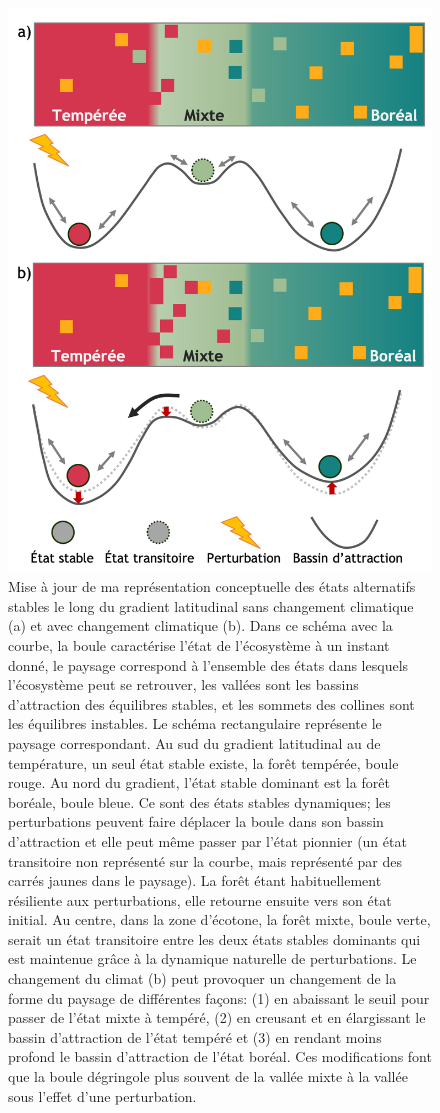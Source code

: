 \begin{figure}
\centering
\includegraphics[width=.65\textwidth]{conclusion/figures/etat_alternatif2.png}
\caption[Représentation conceptuelle des états alternatifs stables le long du gradient latitudinal]{Mise à jour de ma représentation conceptuelle des états alternatifs stables le long du gradient latitudinal sans changement climatique (a) et avec changement climatique (b). Dans ce schéma avec la courbe, la boule caractérise l'état de l'écosystème à un instant donné, le paysage correspond à l'ensemble des états dans lesquels l’écosystème peut se retrouver, les vallées sont les bassins d'attraction des équilibres stables, et les sommets des collines sont les équilibres instables. Le schéma rectangulaire représente le paysage correspondant. Au sud du gradient latitudinal au de température, un seul état stable existe, la forêt tempérée, boule rouge. Au nord du gradient, l'état stable dominant est la forêt boréale, boule bleue. Ce sont des états stables dynamiques; les perturbations peuvent faire déplacer la boule dans son bassin d'attraction et elle peut même passer par l'état pionnier (un état transitoire non représenté sur la courbe, mais représenté par des carrés jaunes dans le paysage). La forêt étant habituellement résiliente aux perturbations, elle retourne ensuite vers son état initial. Au centre, dans la zone d'écotone, la forêt mixte, boule verte, serait un état transitoire entre les deux états stables dominants qui est maintenue grâce à la dynamique naturelle de perturbations. Le changement du climat (b) peut provoquer un changement de la forme du paysage de différentes façons: (1) en abaissant le seuil pour passer de l'état mixte à tempéré, (2) en creusant et en élargissant le bassin d'attraction de l'état tempéré et (3) en rendant moins profond le bassin d'attraction de l'état boréal. Ces modifications font que la boule dégringole plus souvent de la vallée mixte à la vallée sous l'effet d'une perturbation.}
\label{fig4.1}
\end{figure}


